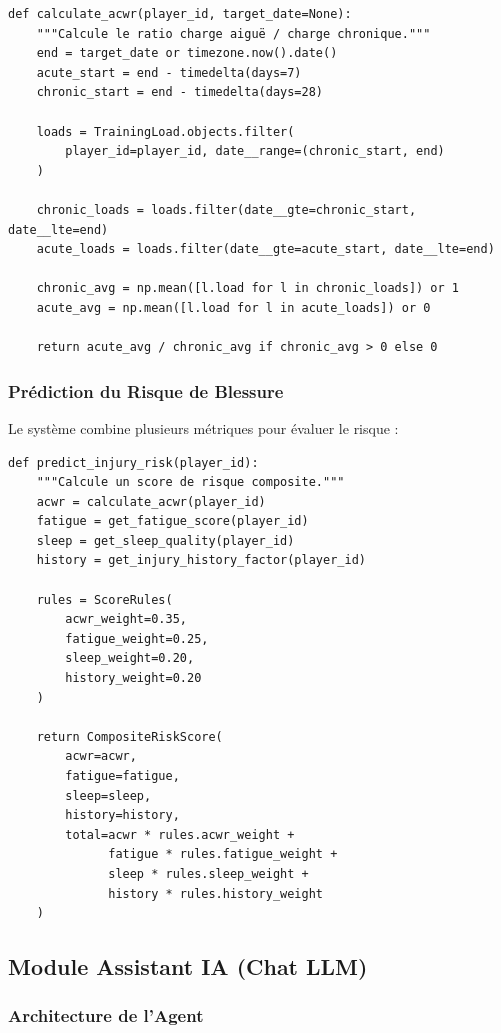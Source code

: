 \begin{lstlisting}[style=codeframe]
def calculate_acwr(player_id, target_date=None):
    """Calcule le ratio charge aiguë / charge chronique."""
    end = target_date or timezone.now().date()
    acute_start = end - timedelta(days=7)
    chronic_start = end - timedelta(days=28)

    loads = TrainingLoad.objects.filter(
        player_id=player_id, date__range=(chronic_start, end)
    )

    chronic_loads = loads.filter(date__gte=chronic_start, date__lte=end)
    acute_loads = loads.filter(date__gte=acute_start, date__lte=end)

    chronic_avg = np.mean([l.load for l in chronic_loads]) or 1
    acute_avg = np.mean([l.load for l in acute_loads]) or 0

    return acute_avg / chronic_avg if chronic_avg > 0 else 0
\end{lstlisting}

\subsubsection{Prédiction du Risque de Blessure}

Le système combine plusieurs métriques pour évaluer le risque :

\begin{lstlisting}[style=codeframe]
def predict_injury_risk(player_id):
    """Calcule un score de risque composite."""
    acwr = calculate_acwr(player_id)
    fatigue = get_fatigue_score(player_id)
    sleep = get_sleep_quality(player_id)
    history = get_injury_history_factor(player_id)

    rules = ScoreRules(
        acwr_weight=0.35,
        fatigue_weight=0.25,
        sleep_weight=0.20,
        history_weight=0.20
    )

    return CompositeRiskScore(
        acwr=acwr,
        fatigue=fatigue,
        sleep=sleep,
        history=history,
        total=acwr * rules.acwr_weight +
              fatigue * rules.fatigue_weight +
              sleep * rules.sleep_weight +
              history * rules.history_weight
    )
\end{lstlisting}

\subsection{Module Assistant IA (Chat LLM)}

\subsubsection{Architecture de l'Agent}

